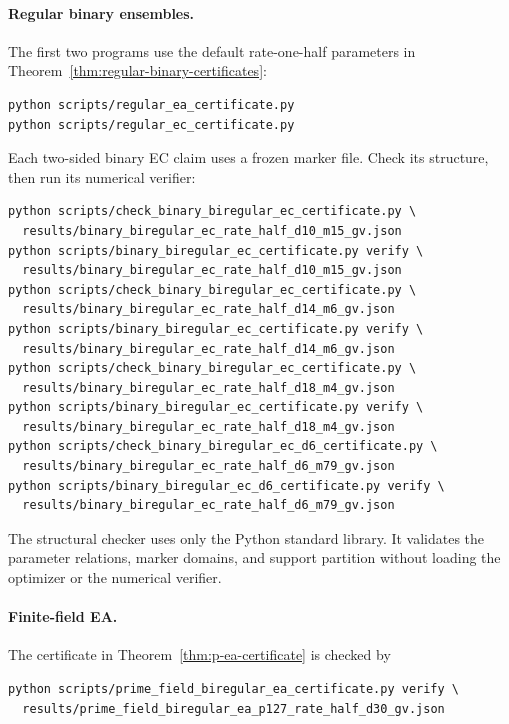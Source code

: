 \paragraph{Regular binary ensembles.}
The first two programs use the default rate-one-half parameters in
Theorem~\ref{thm:regular-binary-certificates}:
\begin{verbatim}
python scripts/regular_ea_certificate.py
python scripts/regular_ec_certificate.py
\end{verbatim}
Each two-sided binary EC claim uses a frozen marker file.  Check its structure,
then run its numerical verifier:
\begin{verbatim}
python scripts/check_binary_biregular_ec_certificate.py \
  results/binary_biregular_ec_rate_half_d10_m15_gv.json
python scripts/binary_biregular_ec_certificate.py verify \
  results/binary_biregular_ec_rate_half_d10_m15_gv.json
python scripts/check_binary_biregular_ec_certificate.py \
  results/binary_biregular_ec_rate_half_d14_m6_gv.json
python scripts/binary_biregular_ec_certificate.py verify \
  results/binary_biregular_ec_rate_half_d14_m6_gv.json
python scripts/check_binary_biregular_ec_certificate.py \
  results/binary_biregular_ec_rate_half_d18_m4_gv.json
python scripts/binary_biregular_ec_certificate.py verify \
  results/binary_biregular_ec_rate_half_d18_m4_gv.json
python scripts/check_binary_biregular_ec_d6_certificate.py \
  results/binary_biregular_ec_rate_half_d6_m79_gv.json
python scripts/binary_biregular_ec_d6_certificate.py verify \
  results/binary_biregular_ec_rate_half_d6_m79_gv.json
\end{verbatim}
The structural checker uses only the Python standard library.  It validates
the parameter relations, marker domains, and support partition without
loading the optimizer or the numerical verifier.

\paragraph{Finite-field EA.}
The certificate in Theorem~\ref{thm:p-ea-certificate} is checked by
\begin{verbatim}
python scripts/prime_field_biregular_ea_certificate.py verify \
  results/prime_field_biregular_ea_p127_rate_half_d30_gv.json
\end{verbatim}

